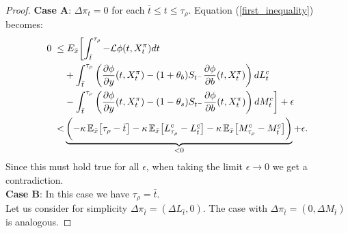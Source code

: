 \begin{proof}
\textbf{Case A}: $\Delta \pi_{t} = 0$ for each $\bar t \leq t \leq \tau_{\rho}$. Equation (\ref{first_inequality}) becomes:
\begin{align}
 0 \; \leq & \; E_{\bar x} \biggl[ \int_{\bar t}^{\tau_{\rho}} -\mathcal{L} \phi(t,X^{\pi}_t) dt \\ \nonumber
    & + \int_{\bar t}^{\tau_{\rho}} \left(\frac{\partial \phi}{\partial y}(t, X^{\pi}_t) -(1+\theta_b) S_{t^-} \frac{\partial \phi}{\partial b}( t, X^{\pi}_t)\right) dL^c_t \\ \nonumber
    & - \int_{\bar t}^{\tau_{\rho}} \left(\frac{\partial \phi}{\partial y}( t, X^{\pi}_t)-(1-\theta_s) S_{t^-} \frac{\partial \phi}{\partial b}( t, X^{\pi}_t)\right) 
         dM^c_t \biggr] + \epsilon\\ \nonumber 
   <& \underbrace{\biggl( -\kappa\, \mathbb{E}_{\bar x} \bigl[ \tau_{\rho} - \bar t \bigr] - \kappa\, \mathbb{E}_{\bar x} \bigl[ L^c_{\tau_{\rho}} - L^c_{\bar t} \bigr]  
   - \kappa\, \mathbb{E}_{\bar x} \bigl[ M^c_{\tau_{\rho}}-M^c_{\bar t} \bigr]  \biggr)}_{<0} + \epsilon. 
\end{align}
Since this must hold true for all $\epsilon$, when taking the limit $\epsilon \to 0$ we get a contradiction.\\

\textbf{Case B}:
In this case we have $\tau_{\rho} = \bar t$. \\
Let us consider for simplicity $\Delta \pi_{\bar t} = (\Delta L_{\bar t}, 0)$. The case with $\Delta \pi_{\bar t} = (0, \Delta M_{\bar t})$ is analogous.


\end{proof}
